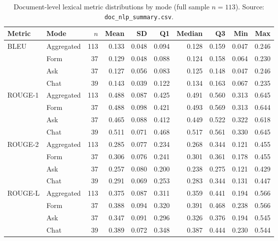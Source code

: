 \begin{table}
\centering
\caption{Document-level lexical metric distributions by mode (full
sample $n = 113$). Source: \texttt{doc\_nlp\_summary.csv}.}
\label{tab:nlp-doc-distrib-lexical}
\small
\begin{tabular}{@{}l l r r r r r r r r@{}}
\toprule
Metric & Mode & $n$ & Mean & SD & Q1 & Median & Q3 & Min & Max \\
\midrule
\multirow{4}{*}{BLEU}    & Aggregated  & 113 & 0.133 & 0.048 & 0.094 & 0.128 & 0.159 & 0.047 & 0.246 \\
                         & Form & 37  & 0.129 & 0.048 & 0.088 & 0.124 & 0.158 & 0.064 & 0.230 \\
                         & Ask  & 37  & 0.127 & 0.056 & 0.083 & 0.125 & 0.148 & 0.047 & 0.246 \\
                         & Chat & 39  & 0.143 & 0.039 & 0.122 & 0.134 & 0.163 & 0.067 & 0.235 \\
\midrule
\multirow{4}{*}{ROUGE-1} & Aggregated  & 113 & 0.488 & 0.087 & 0.425 & 0.491 & 0.560 & 0.313 & 0.645 \\
                         & Form & 37  & 0.488 & 0.098 & 0.421 & 0.493 & 0.569 & 0.313 & 0.644 \\
                         & Ask  & 37  & 0.465 & 0.088 & 0.412 & 0.449 & 0.522 & 0.322 & 0.618 \\
                         & Chat & 39  & 0.511 & 0.071 & 0.468 & 0.517 & 0.561 & 0.330 & 0.645 \\
\midrule
\multirow{4}{*}{ROUGE-2} & Aggregated  & 113 & 0.285 & 0.077 & 0.234 & 0.268 & 0.344 & 0.121 & 0.455 \\
                         & Form & 37  & 0.306 & 0.076 & 0.241 & 0.301 & 0.361 & 0.178 & 0.455 \\
                         & Ask  & 37  & 0.257 & 0.080 & 0.200 & 0.238 & 0.275 & 0.121 & 0.429 \\
                         & Chat & 39  & 0.291 & 0.069 & 0.253 & 0.283 & 0.344 & 0.131 & 0.447 \\
\midrule
\multirow{4}{*}{ROUGE-L} & Aggregated  & 113 & 0.375 & 0.087 & 0.311 & 0.359 & 0.441 & 0.194 & 0.566 \\
                         & Form & 37  & 0.388 & 0.094 & 0.320 & 0.391 & 0.468 & 0.238 & 0.566 \\
                         & Ask  & 37  & 0.347 & 0.091 & 0.296 & 0.326 & 0.376 & 0.194 & 0.545 \\
                         & Chat & 39  & 0.389 & 0.072 & 0.348 & 0.387 & 0.444 & 0.230 & 0.544 \\

\end{tabular}
\end{table}
